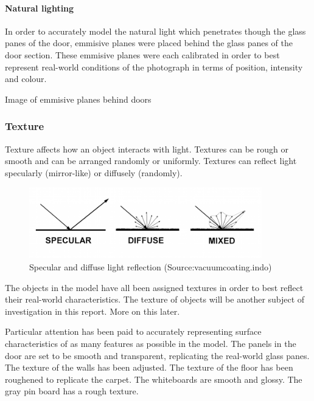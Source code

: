 \documentclass[11pt,a4paper]{report}
\begin{document}
				\paragraph{Natural lighting}
					In order to accurately model the natural light which penetrates though the glass panes of the door, emmisive planes were placed behind the glass panes of the door section. These emmisive planes were each calibrated in order to best represent real-world conditions of the photograph in terms of position, intensity and colour.
					
					{{Image of emmisive planes behind doors}}
			\subsubsection{Texture}
				Texture affects how an object interacts with light. Textures can be rough or smooth and can be arranged randomly or uniformly. Textures can reflect light specularly (mirror-like) or diffusely (randomly).
				
				
				\begin{figure}[H]
					\centering
					\includegraphics[width=0.9\textwidth]{light_reflection}
					\caption{Specular and diffuse light reflection (Source:vacuumcoating.indo)}
					\label{fig:light_reflection}
				\end{figure}
				The objects in the model have all been assigned textures in order to best reflect their real-world characteristics. The texture of objects will be another subject of investigation in this report. More on this later.
				
				Particular attention has been paid to accurately representing surface characteristics of as many features as possible in the model.
				The panels in the door are set to be smooth and transparent, replicating the real-world glass panes. 
				The texture of the walls has been adjusted.
				The texture of the floor has been roughened to replicate the carpet.
				The whiteboards are smooth and glossy.
				The gray pin board has a rough texture.
				
\end{document}

